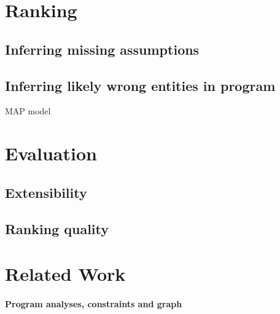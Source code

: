 % 
% 
% 
% 
% 
% 
\section{Ranking}
\label{sec:ranking}

\subsection{Inferring missing assumptions}
\label{sec:assumptions}

\subsection{Inferring likely wrong entities in program}

MAP model

\section{Evaluation}

\subsection{Extensibility}

\subsection{Ranking quality}

\section{Related Work}

\paragraph{Program analyses, constraints and graph} 

